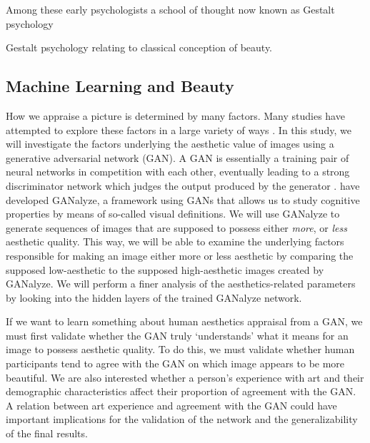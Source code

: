 \documentclass[../main.tex]{subfiles}
\begin{document}
Among these early psychologists a school of thought now known as Gestalt psychology 

Gestalt psychology relating to classical conception of beauty.



\subsection{Machine Learning and Beauty}


How we appraise a picture is determined by many factors. Many studies have attempted to explore these factors in a large variety of ways \parencite{deng2017image}. In this study, we will investigate the factors underlying the aesthetic value of images using a generative adversarial network (GAN). A GAN is essentially a training pair of neural networks in competition with each other, eventually leading to a strong discriminator network which judges the output produced by the generator \parencite{creswellGenerativeAdversarialNetworks2018}. \textcite{goetschalckxGANalyzeVisualDefinitions2019} have developed GANalyze, a framework using GANs that allows us to study cognitive properties by means of so-called visual definitions. We will use GANalyze to generate sequences of images that are supposed to possess either \textit{more}, or \textit{less} aesthetic quality. This way, we will be able to examine the underlying factors responsible for making an image either more or less aesthetic by comparing the supposed low-aesthetic to the supposed high-aesthetic images created by GANalyze. We will perform a finer analysis of the aesthetics-related parameters by looking into the hidden layers of the trained GANalyze network.

If we want to learn something about human aesthetics appraisal from a GAN, we must first validate whether the GAN truly `understands' what it means for an image to possess aesthetic quality. To do this, we must validate whether human participants tend to agree with the GAN on which image appears to be more beautiful. We are also interested whether a person's experience with art and their demographic characteristics affect their proportion of agreement with the GAN. A relation between art experience and agreement with the GAN could have important implications for the validation of the network and the generalizability of the final results.
\end{document}
